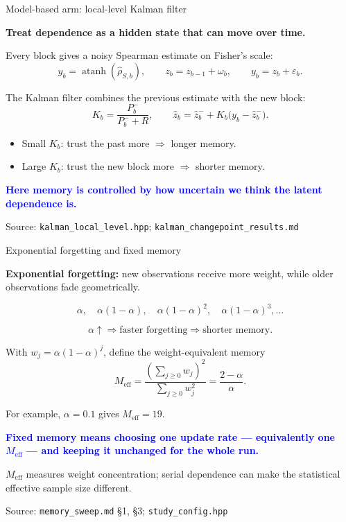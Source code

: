 \documentclass[aspectratio=169,11pt]{beamer}
\newcommand{\mem}{M_{\mathrm{eff}}}
\newcommand{\good}[1]{\textcolor{blue}{\textbf{#1}}}
\newcommand{\src}[1]{\vfill{\tiny\color{gray}Source: #1}}
\begin{document}
\begin{frame}{Model-based arm: local-level Kalman filter}

  \textbf{Treat dependence as a hidden state that can move over time.}

  \medskip

  Every block gives a noisy Spearman estimate on Fisher's scale:
  \[
    y_b=\operatorname{atanh}(\widehat\rho_{S,b}),
    \qquad
    z_b=z_{b-1}+\omega_b,
    \qquad
    y_b=z_b+\varepsilon_b.
  \]

  The Kalman filter combines the previous estimate with the new block:
  \[
    K_b=\frac{P_b^-}{P_b^-+R},
    \qquad
    \widehat z_b
      =\widehat z_b^-+K_b\bigl(y_b-\widehat z_b^-\bigr).
  \]

  \begin{itemize}
    \item Small $K_b$: trust the past more $\Rightarrow$ longer memory.
    \item Large $K_b$: trust the new block more $\Rightarrow$ shorter memory.
  \end{itemize}

  \good{Here memory is controlled by how uncertain we think the latent dependence is.}

  \src{\texttt{kalman\_local\_level.hpp};
       \texttt{kalman\_changepoint\_results.md}}
\end{frame}

\begin{frame}{Exponential forgetting and fixed memory}

  \textbf{Exponential forgetting:} new observations receive more weight,
  while older observations fade geometrically.

  \[
    \alpha,\quad
    \alpha(1-\alpha),\quad
    \alpha(1-\alpha)^2,\quad
    \alpha(1-\alpha)^3,\ldots
  \]

  \[
    \alpha\uparrow
    \Rightarrow
    \text{faster forgetting}
    \Rightarrow
    \text{shorter memory}.
  \]

  With $w_j=\alpha(1-\alpha)^j$, define the weight-equivalent memory
  \[
    \mem
      =\frac{(\sum_{j\ge0}w_j)^2}{\sum_{j\ge0}w_j^2}
      =\frac{2-\alpha}{\alpha}.
  \]

  \small
  For example, $\alpha=0.1$ gives $\mem=19$.

  \medskip

  \good{Fixed memory means choosing one update rate --- equivalently one
  $\mem$ --- and keeping it unchanged for the whole run.}

  \medskip
  \scriptsize
  $\mem$ measures weight concentration; serial dependence can make the
  statistical effective sample size different.

  \src{\texttt{memory\_sweep.md} \S1, \S3;
       \texttt{study\_config.hpp}}
\end{frame}
\end{document}
